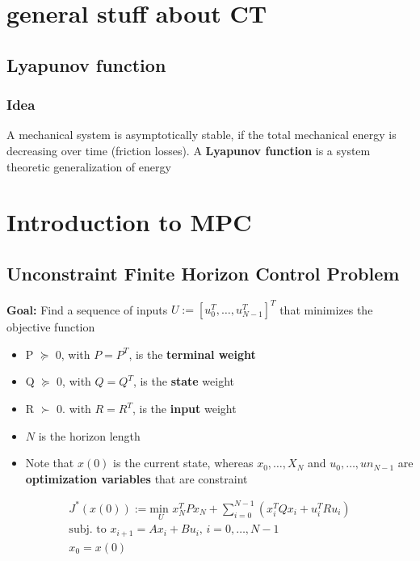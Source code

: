 \section{general stuff about CT}
\subsection{Lyapunov function}
\subsubsection{Idea}
 A mechanical system is asymptotically stable, if the total mechanical energy is decreasing over time (friction losses). A \textbf{Lyapunov function} is a system theoretic generalization of energy
\section{Introduction to MPC} 
\subsection{Unconstraint Finite Horizon Control Problem}
\textbf{Goal:} Find a sequence of inputs $U:=[u_0^T,\dots,u_{N-1}^T]^T$ that minimizes the objective function
\begin{itemize}
    \item P $\succeq$ 0, with $P=P^T$, is the \textbf{terminal weight}
    \item Q $\succeq$ 0, with $Q=Q^T$, is the \textbf{state} weight
    \item R $\succ$ 0. with $R=R^T$, is the \textbf{input} weight
    \item $N$ is the horizon length
    \item Note that $x(0)$ is the current state, whereas $x_0,\dots,X_N$ and $u_0,\dots,un_{N-1}$ are \textbf{optimization variables} that are constraint
\end{itemize}

\begin{gather*}
    J^*(x(0)) := \underset{U}{\textrm{min }}x_N^TPx_N+\sum^{N-1}_{i=0}(x_i^TQx_i+u_i^TRu_i)\\
    \textrm{subj. to }x_{i+1}=Ax_i+Bu_i\textrm{, } i = 0,\dots,N-1\\
    x_0 = x(0)
\end{gather*}

